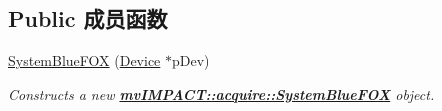 \subsection*{Public 成员函数}
\begin{DoxyCompactItemize}
\item 
\hyperlink{classmv_i_m_p_a_c_t_1_1acquire_1_1_system_blue_f_o_x_ac039cd80970d6004a1676410f26d651b}{System\+Blue\+F\+O\+X} (\hyperlink{classmv_i_m_p_a_c_t_1_1acquire_1_1_device}{Device} $\ast$p\+Dev)
\begin{DoxyCompactList}\small\item\em Constructs a new {\bfseries \hyperlink{classmv_i_m_p_a_c_t_1_1acquire_1_1_system_blue_f_o_x}{mv\+I\+M\+P\+A\+C\+T\+::acquire\+::\+System\+Blue\+F\+O\+X}} object. \end{DoxyCompactList}\end{DoxyCompactItemize}
